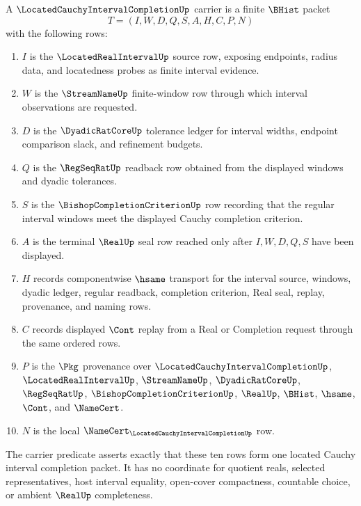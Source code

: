 \begin{definition}
\label{def:located-cauchy-interval-completion-carrier}
A $\LocatedCauchyIntervalCompletionUp$ carrier is a finite $\BHist$ packet
$$
T=(I,W,D,Q,S,A,H,C,P,N)
$$
with the following rows:
\begin{enumerate}
\item $I$ is the $\LocatedRealIntervalUp$ source row, exposing endpoints, radius data, and locatedness probes as finite interval evidence.
\item $W$ is the $\StreamNameUp$ finite-window row through which interval observations are requested.
\item $D$ is the $\DyadicRatCoreUp$ tolerance ledger for interval widths, endpoint comparison slack, and refinement budgets.
\item $Q$ is the $\RegSeqRatUp$ readback row obtained from the displayed windows and dyadic tolerances.
\item $S$ is the $\BishopCompletionCriterionUp$ row recording that the regular interval windows meet the displayed Cauchy completion criterion.
\item $A$ is the terminal $\RealUp$ seal row reached only after $I,W,D,Q,S$ have been displayed.
\item $H$ records componentwise $\hsame$ transport for the interval source, windows, dyadic ledger, regular readback, completion criterion, Real seal, replay, provenance, and naming rows.
\item $C$ records displayed $\Cont$ replay from a Real or Completion request through the same ordered rows.
\item $P$ is the $\Pkg$ provenance over $\LocatedCauchyIntervalCompletionUp$, $\LocatedRealIntervalUp$, $\StreamNameUp$, $\DyadicRatCoreUp$, $\RegSeqRatUp$, $\BishopCompletionCriterionUp$, $\RealUp$, $\BHist$, $\hsame$, $\Cont$, and $\NameCert$.
\item $N$ is the local $\NameCert_{\LocatedCauchyIntervalCompletionUp}$ row.
\end{enumerate}
The carrier predicate asserts exactly that these ten rows form one located Cauchy interval completion packet. It has no coordinate for quotient reals, selected representatives, host interval equality, open-cover compactness, countable choice, or ambient $\RealUp$ completeness.
\end{definition}

